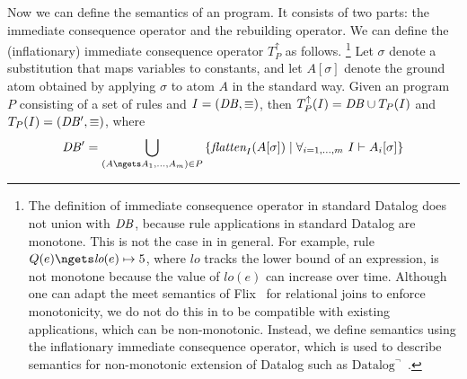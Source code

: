 Now we can define the semantics of an \egglog program.
It consists of two parts: the immediate consequence operator and the rebuilding operator.
We can define the (inflationary) immediate consequence
 operator $T^\uparrow_P$ as follows.%
 \footnote{
     The definition of immediate consequence operator
      in standard Datalog does not union with $\mathit{DB}{}$,
     because rule applications in standard Datalog are monotone.
     This is not the case in \egglog in general.
     For example, rule $Q(e)\ngets \textit{lo}(e)\mapsto 5$, where 
      $\textit{lo}$ tracks the lower bound of an expression,
     is not monotone because the value of $\textit{lo}(e)$ can increase over time.
     Although one can adapt the meet semantics of Flix~\citep{flix} for relational joins to enforce monotonicity, 
     we do not do this in \egglog to be compatible with existing \egg applications, 
     which can be non-monotonic.
     Instead, we define \egglog semantics using the inflationary immediate consequence operator, 
     which is used to describe semantics for non-monotonic extension of Datalog such as $\text{Datalog}^\neg$~\citep{neg-by-fixpoint}.
 }
Let $\sigma$ denote a substitution that maps variables to constants,
 and let $A[\sigma]$ denote the ground atom obtained by applying $\sigma$ to atom $A$
 in the standard way.
Given an \egglog program $P$ 
 consisting of a set of rules and $I=(\mathit{DB}{}, \equiv)$,
 then $T^{\uparrow}_P(I)=\mathit{DB}\cup T_P(I)$ and $T_P(I)=(\mathit{DB}{}', \equiv)$, where
\[
    \DB{}'=
    \bigcup_{
        (A\ngets A_1,\ldots, A_m) \in P
    }
    \left\{ 
        \displaystyle
        \textit{flatten}_I(A[\sigma])\mid
        \forall_{i=1,\ldots,m}\ 
        I\vdash A_i[\sigma]
    \right\}
\]

